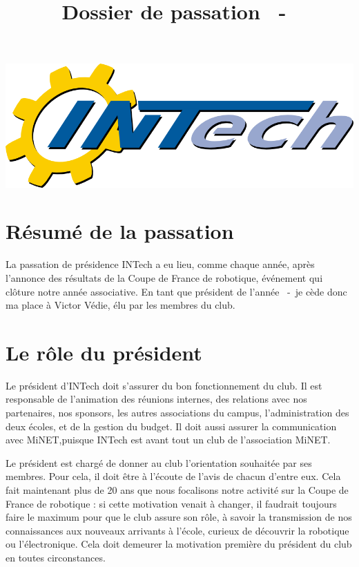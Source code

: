 \documentclass[a4paper,10pt]{article}
\title{Dossier de passation \theannee~-~\theanneesuiv}
\author{\ancienprez}
\newcommand{\nouveauprez}{Victor Védie}
\newcounter{annee}
\newcounter{anneeprec}
\begin{document}
\maketitle

\begin{center}
\includegraphics[scale=0.3]{logo-grand.png}
\end{center}


\section{Résumé de la passation}

La passation de présidence INTech a eu lieu, comme chaque année, après l'annonce des résultats de la Coupe de France de robotique, 
événement qui clôture notre année associative. En tant que président de l'année \theanneeprec~-~\theannee \space je cède donc ma place à 
\nouveauprez, élu par les membres du club. 

\section{Le rôle du président}

Le président d'INTech doit s'assurer du bon fonctionnement du club. Il est responsable de l'animation des réunions internes,
des relations avec nos partenaires, nos sponsors, les autres associations du campus, l'administration des deux écoles, et de la gestion du budget.
Il doit aussi assurer la communication avec MiNET,puisque INTech est avant tout un club de l'association MiNET. \newline

Le président est chargé de donner au club l'orientation souhaitée par ses membres. Pour cela, il doit être à l'écoute de l'avis de chacun d'entre eux.
Cela fait maintenant plus de 20 ans que nous focalisons notre activité sur la Coupe de France de robotique : si cette motivation venait à changer, il faudrait toujours 
faire le maximum pour que le club assure son rôle, à savoir la transmission de nos connaissances aux nouveaux arrivants à l'école,
curieux de découvrir la robotique ou l'électronique. Cela doit demeurer la motivation première du président du club en toutes circonstances.\newline
\end{document}
